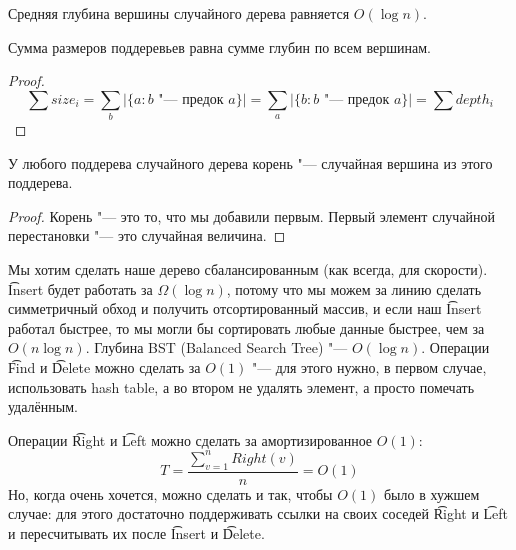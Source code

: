 \begin{theorem}{}
	Средняя глубина вершины случайного дерева равняется $O(\log n)$.
\end{theorem}
\begin{lemma}
	Сумма размеров поддеревьев равна сумме глубин по всем вершинам.
\end{lemma}
\begin{proof}
	\[ 
		\sum size_{i} = \sum_{b} |\{a \colon \text{$b$ "--- предок $a$}\}| = 
		\sum_{a} |\{b \colon \text{$b$ "--- предок $a$} \}| = \sum depth_{i} 
	\]
\end{proof}

\begin{lemma}
	У любого поддерева случайного дерева корень "--- случайная вершина из этого поддерева.
\end{lemma}
\begin{proof}
	Корень "--- это то, что мы добавили первым. Первый элемент случайной перестановки "--- это случайная величина.
\end{proof}

Мы хотим сделать наше дерево сбалансированным (как всегда, для скорости).
\t{Insert} будет работать за $\Omega(\log n)$, потому что 
мы можем за линию сделать симметричный обход и получить отсортированный массив, и 
если наш \t{Insert} работал быстрее, то мы могли бы сортировать 
любые данные быстрее, чем за $O(n \log n)$. 
Глубина BST (Balanced Search Tree) "--- $O(\log n)$. 
Операции \t{Find} и \t{Delete} можно сделать за $O(1)$ "--- для этого нужно, 
в первом случае, использовать hash table, а во втором не удалять элемент, 
а просто помечать удалённым.

Операции \t{Right} и \t{Left} можно сделать за амортизированное $O(1)$:
\[ T = \frac{\sum_{v = 1}^{n}Right(v)}{n} = O(1) \]
Но, когда очень хочется, можно сделать и так, чтобы $O(1)$ было в хужшем случае: для этого достаточно поддерживать ссылки на своих соседей \t{Right} и \t{Left} 
и пересчитывать их после \t{Insert} и \t{Delete}.
